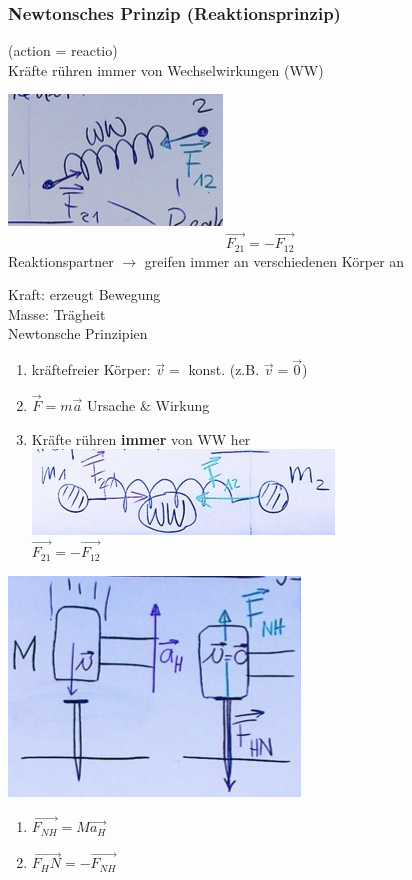 \subsubsection{Newtonsches Prinzip (Reaktionsprinzip)}
(action = reactio) \\
Kräfte rühren immer von Wechselwirkungen (WW)
\begin{bsp*}[note = Feder]
	\includegraphics{Bild20}
	\[ \vec{F_{21}} = -\vec{F_{12}} \]
	Reaktionspartner $\rightarrow$ greifen immer an verschiedenen Körper an
\end{bsp*}
\begin{rep*}[ note = Dynamik ]
	Kraft: erzeugt Bewegung \\
	Masse: Trägheit \\
	Newtonsche Prinzipien \\
	\begin{enumerate}
		\item kräftefreier Körper: $\vec{v} =$ konst. (z.B. $\vec{v} = \vec{0}$)
		\item $\vec{F} = m \vec{a}$ Ursache \& Wirkung
		\item Kräfte rühren \textbf{immer} von WW her \\
			\includegraphics{Bild21} \\
			$\vec{F_{21}} = -\vec{F_12}$
	\end{enumerate}
\end{rep*}
\begin{bsp*}[ note = Hammer \& Nagel ]
	\includegraphics{Bild22}
	\begin{enumerate}[start = 2]
		\item $\vec{F_{NH}} = M \vec{a_H}$
		\item $\vec{F_HN} = -\vec{F_{NH}}$
	\end{enumerate}
\end{bsp*}

